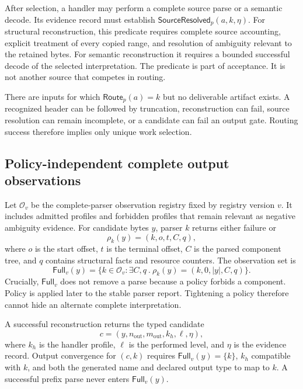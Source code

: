 After selection, a handler may perform a complete source parse or a semantic
decode. Its evidence record must establish
$\mathsf{SourceResolved}_p(a,k,\eta)$. For structural reconstruction, this
predicate requires complete source accounting, explicit treatment of every
copied range, and resolution of ambiguity relevant to the retained bytes. For
semantic reconstruction it requires a bounded successful decode of the selected
interpretation. The predicate is part of acceptance. It is not another source
that competes in routing.

\begin{property}
\label{prop:routing-nonauthorizing}
There are inputs for which $\mathsf{Route}_p(a)=k$ but no deliverable artifact
exists. A recognized header can be followed by truncation, reconstruction can
fail, source resolution can remain incomplete, or a candidate can fail an
output gate. Routing success therefore implies only unique work selection.
\end{property}

\subsection{Policy-independent complete output observations}

Let $\mathcal{O}_v$ be the complete-parser observation registry fixed by
registry version $v$. It includes admitted profiles and forbidden profiles that
remain relevant as negative ambiguity evidence. For candidate bytes $y$, parser
$k$ returns either failure or
\begin{equation}
  \rho_k(y)=(k,o,t,C,q),
  \label{eq:parse-report}
\end{equation}
where $o$ is the start offset, $t$ is the terminal offset, $C$ is the parsed
component tree, and $q$ contains structural facts and resource counters. The
observation set is
\begin{equation}
  \mathsf{Full}_v(y)=
  \{k\in\mathcal{O}_v:\exists C,q\ .\
    \rho_k(y)=(k,0,|y|,C,q)\}.
  \label{eq:full-parser-set}
\end{equation}
Crucially, $\mathsf{Full}_v$ does not remove a parse because a policy forbids a
component. Policy is applied later to the stable parser report. Tightening a
policy therefore cannot hide an alternate complete interpretation.

A successful reconstruction returns the typed candidate
\begin{equation}
  c=(y,n_{\mathrm{out}},m_{\mathrm{out}},k_h,\ell,\eta),
  \label{eq:candidate-artifact}
\end{equation}
where $k_h$ is the handler profile, $\ell$ is the performed level, and $\eta$
is the evidence record. Output convergence for $(c,k)$ requires
$\mathsf{Full}_v(y)=\{k\}$, $k_h$ compatible with $k$, and both the generated
name and declared output type to map to $k$. A successful prefix parse never
enters $\mathsf{Full}_v(y)$.

